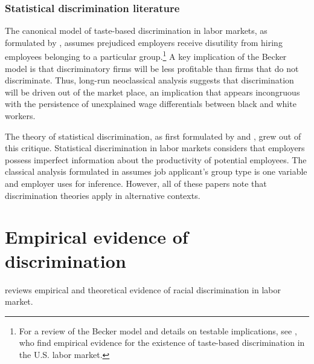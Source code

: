 \documentclass[10 pt]{article}
\begin{document}
\subsubsection*{Statistical discrimination literature}

The canonical model of taste-based discrimination in labor markets, as formulated by \textcite{B57}, assumes prejudiced employers receive disutility from hiring employees belonging to a particular group.\footnote{
    For a review of the Becker model and details on testable implications, see \textcite{CG08}, who find empirical evidence for the existence of taste-based discrimination in the U.S. labor market.
} 
A key implication of the Becker model is that discriminatory firms will be less profitable than firms that do not discriminate. 
Thus, long-run neoclassical analysis suggests that discrimination will be driven out of the market place, an implication that appears incongruous with the persistence of unexplained wage differentials between black and white workers.

The theory of statistical discrimination, as first formulated by \textcite{A72} and \textcite{P72}, grew out of this critique.
Statistical discrimination in labor markets considers that employers possess imperfect information about the productivity of potential employees. 
The classical analysis formulated in \textcite{AC77} assumes job applicant's group type is one variable and employer uses for inference. 
However, all of these papers note that discrimination theories apply in alternative contexts.


\section{Empirical evidence of discrimination}

\begin{blist}

\item \textcite{LL12} reviews empirical and theoretical evidence of racial discrimination in labor market. 

\end{blist}
\end{document}
